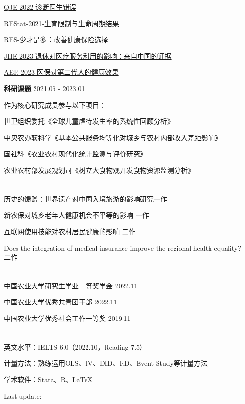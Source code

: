 \documentclass[UTF8,11pt]{ctexart}
\begin{document}
\href{https://mp.weixin.qq.com/s/n0ddY4ehLmLXIS721hpWDw}{QJE-2022-诊断医生错误}

\href{https://mp.weixin.qq.com/s/ujISRry78_zRRUyTqoCphw}{REStat-2021-生育限制与生命周期结果}

\href{https://mp.weixin.qq.com/s/Y0sbGK6QZ-_b_ZFRPz-7tA}{RES-少才是多：改善健康保险选择}

\href{https://mp.weixin.qq.com/s/sCwhARBH4hc1JWDZ_8MWQw}{JHE-2023-退休对医疗服务利用的影响：来自中国的证据}

\href{https://mp.weixin.qq.com/s/4R-zSL2FUM8iGr-EXmFGaQ}{AER-2023-医保对第二代人的健康效果}

\bigskip

\textbf{科研课题} \tab{}  \hfill 2021.06 - 2023.01

作为核心研究成员参与以下项目：

世卫组织委托《全球儿童虐待发生率的系统性回顾分析》

中央农办软科学《基本公共服务均等化对城乡与农村内部收入差距影响》 

国社科《农业农村现代化统计监测与评价研究》

农业农村部发展规划司《树立大食物观开发食物资源监测分析》 

\section{\underline{}}

\hspace{2em}历史的馈赠：世界遗产对中国入境旅游的影响研究\hfill 一作 

新农保对城乡老年人健康机会不平等的影响 \hfill 一作 

互联网使用技能对农村居民健康的影响 \hfill 二作 

Does the integration of medical insurance improve the regional health equality? \hfill 二作 

\section{\underline{}}

\hspace{2em}中国农业大学研究生学业一等奖学金  \hfill 2022.11  

中国农业大学优秀共青团干部   \hfill 2022.11  

中国农业大学优秀社会工作一等奖  \hfill 2019.11 

\section{\underline{}}

\hspace{2em}英文水平：IELTS 6.0（2022.10，Reading 7.5）

计量方法：熟练运用OLS、IV、DID、RD、Event Study等计量方法

学术软件：Stata、R、\LaTeX


\vfill \hfill Last update: \date{\today}
\end{document}
